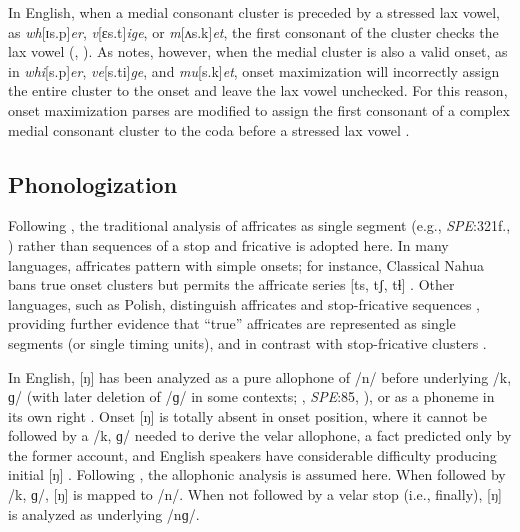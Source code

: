 \documentclass[12pt]{article}
\begin{document}
In English, when a medial consonant cluster is preceded by a stressed lax vowel, as \emph{wh}[ɪs.p]\emph{er}, \emph{v}[ɛs.t]\emph{ige}, or \emph{m}[ʌs.k]\emph{et}, the first consonant of the cluster checks the lax vowel (\citealt[3]{Hammond1997}, \citealt{Treiman1990}). As \citet[55]{Harris1994} notes, however, when the medial cluster is also a valid onset, as in \emph{whi}[s.p]\emph{er}, \emph{ve}[s.ti]\emph{ge}, and \emph{mu}[s.k]\emph{et}, onset maximization will incorrectly assign the entire cluster to the onset and leave the lax vowel unchecked. For this reason, onset maximization parses are modified to assign the first consonant of a complex medial consonant cluster to the coda before a stressed lax vowel \citep[48]{Pulgram1970}.

\subsection{Phonologization}
\label{s:phonologization}

Following \citet{Pierrehumbert1994}, the traditional analysis of affricates as single segment (e.g., \emph{SPE}:321f., \citealp[24]{Jakobson1961}) rather than sequences of a stop and fricative \citep[e.g.,][]{Hualde1988,Lombardi1990} is adopted here.
In many languages, affricates pattern with simple onsets; for instance, Classical Nahua bans true onset clusters but permits the affricate series [ts, tʃ, tɬ] \citep[9]{Launey2011}.
Other languages, such as Polish, distinguish affricates and stop-fricative sequences \citep{Brooks1965}, providing further evidence that ``true'' affricates are represented as single segments (or single timing units), and in contrast with stop-fricative clusters \citep[34f.]{Clements1983}.

In English, [ŋ] has been analyzed as a pure allophone of /n/ before underlying /k, ɡ/ (with later deletion of /ɡ/ in some contexts; \citealt[65f.]{Borowsky1986}, \emph{SPE}:85, \citealt[62]{Halle1985a}), or as a phoneme in its own right \citep[e.g.,][]{Jusczyk2002,Sapir1925}. 
Onset [ŋ] is totally absent in onset position, where it cannot be followed by a /k, ɡ/ needed to derive the velar allophone, a fact predicted only by the former account, and English speakers have considerable difficulty producing initial [ŋ] \citep{Rusaw2009}. 
Following \citet{Pierrehumbert1994}, the allophonic analysis is assumed here. When followed by /k, ɡ/, [ŋ] is mapped to /n/. 
When not followed by a velar stop (i.e., finally), [ŋ] is analyzed as underlying /nɡ/.





\end{document}
